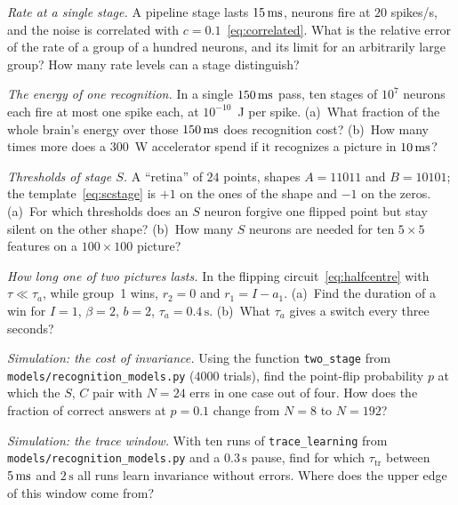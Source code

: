 \begin{exercise}[\lvlA]
\label{ex:12:1}
\emph{Rate at a single stage.} A pipeline stage lasts $15\,\text{ms}$, neurons fire at $20$ spikes/s, and the noise is correlated with $c=0.1$~\eqref{eq:correlated}. What is the relative error of the rate of a group of a hundred neurons, and its limit for an arbitrarily large group? How many rate levels can a stage distinguish?
\end{exercise}

\begin{exercise}[\lvlA]
\label{ex:12:2}
\emph{The energy of one recognition.} In a single $150\,\text{ms}$ pass, ten stages of $10^7$ neurons each fire at most one spike each, at $10^{-10}$~J per spike. (a)~What fraction of the whole brain's energy over those $150\,\text{ms}$ does recognition cost? (b)~How many times more does a $300$~W accelerator spend if it recognizes a picture in $10\,\text{ms}$?
\end{exercise}

\begin{exercise}[\lvlB]
\label{ex:12:3}
\emph{Thresholds of stage $S$.} A ``retina'' of $24$ points, shapes $A=11011$ and $B=10101$; the template~\eqref{eq:scstage} is $+1$ on the ones of the shape and $-1$ on the zeros. (a)~For which thresholds does an $S$ neuron forgive one flipped point but stay silent on the other shape? (b)~How many $S$ neurons are needed for ten $5\times5$ features on a $100\times100$ picture?
\end{exercise}

\begin{exercise}[\lvlB]
\label{ex:12:4}
\emph{How long one of two pictures lasts.} In the flipping circuit~\eqref{eq:halfcentre} with $\tau\ll\tau_a$, while group~1 wins, $r_2=0$ and $r_1=I-a_1$. (a)~Find the duration of a win for $I=1$, $\beta=2$, $b=2$, $\tau_a=0.4\,\text{s}$. (b)~What $\tau_a$ gives a switch every three seconds?
\end{exercise}

\begin{exercise}[\lvlB]
\label{ex:12:5}
\emph{Simulation: the cost of invariance.} Using the function \texttt{two\_stage} from \texttt{models/\allowbreak recognition\_models.py} ($4000$ trials), find the point-flip probability $p$ at which the $S$, $C$ pair with $N=24$ errs in one case out of four. How does the fraction of correct answers at $p=0.1$ change from $N=8$ to $N=192$?
\end{exercise}

\begin{exercise}[\lvlB]
\label{ex:12:6}
\emph{Simulation: the trace window.} With ten runs of \texttt{trace\_learning} from \texttt{models/\allowbreak recognition\_models.py} and a $0.3\,\text{s}$ pause, find for which $\tau_{\text{tr}}$ between $5\,\text{ms}$ and $2\,\text{s}$ all runs learn invariance without errors. Where does the upper edge of this window come from?
\end{exercise}

